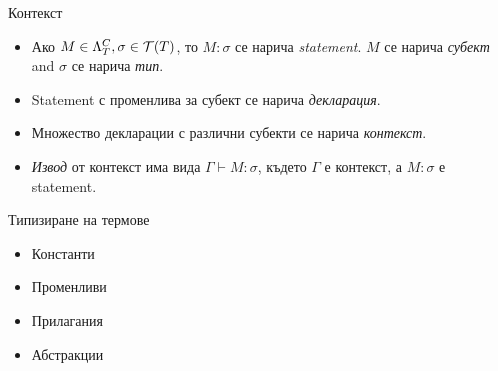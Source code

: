 \documentclass[9pt]{beamer}
\begin{document}
  \begin{frame}{Контекст}
    \begin{itemize}
      \item Ако $M \in \plambda{T}{C}, \sigma \in \tclos{T}$, то $M : \sigma$ се нарича
          \emph{statement}. $M$ се нарича \emph{субект} and $\sigma$
          се нарича \emph{тип}.
      \item Statement с променлива за субект се нарича \emph{декларация}.
      \item Множество декларации с различни субекти се нарича \emph{контекст}.
      \item \emph{Извод} от контекст има вида $\Gamma \vdash M: \sigma$, където
          $\Gamma$ е контекст, а $M: \sigma$ е statement.
    \end{itemize}
  \end{frame}

  \begin{frame}{Типизиране на термове}
    \begin{itemize}
        \item Константи
        \item Променливи
        \item Прилагания
        \item Абстракции
    \end{itemize}
  \end{frame}
\end{document}
